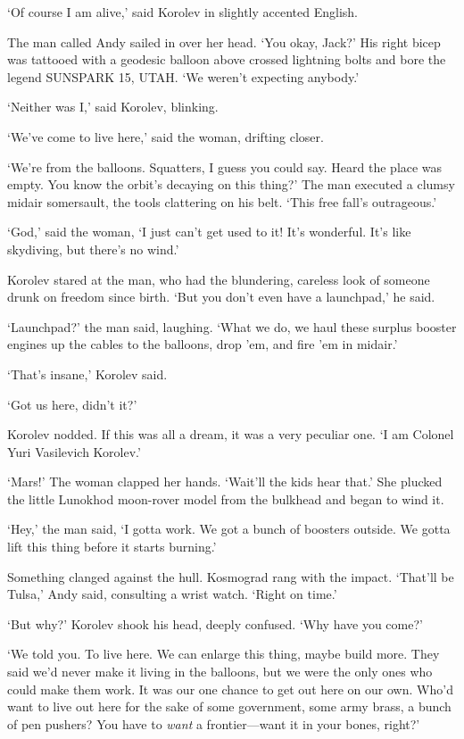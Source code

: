 `Of course I am alive,' said Korolev in slightly accented English.

The man called Andy sailed in over her head. `You okay, Jack?' His right bicep was tattooed with a geodesic balloon above crossed lightning bolts and bore the legend SUNSPARK 15, UTAH. `We weren't expecting anybody.'

`Neither was I,' said Korolev, blinking.

`We've come to live here,' said the woman, drifting closer.

`We're from the balloons. Squatters, I guess you could say. Heard the place was empty. You know the orbit's decaying on this thing?' The man executed a clumsy midair somersault, the tools clattering on his belt. `This free fall's outrageous.'

`God,' said the woman, `I just can't get used to it! It's wonderful. It's like skydiving, but there's no wind.'

Korolev stared at the man, who had the blundering, careless look of someone drunk on freedom since birth. `But you don't even have a launchpad,' he said.

`Launchpad?' the man said, laughing. `What we do, we haul these surplus booster engines up the cables to the balloons, drop 'em, and fire 'em in midair.'

`That's insane,' Korolev said.

`Got us here, didn't it?'

Korolev nodded. If this was all a dream, it was a very peculiar one. `I am Colonel Yuri Vasilevich Korolev.'

`Mars!' The woman clapped her hands. `Wait'll the kids hear that.' She plucked the little Lunokhod moon-rover model from the bulkhead and began to wind it.

`Hey,' the man said, `I gotta work. We got a bunch of boosters outside. We gotta lift this thing before it starts burning.'

Something clanged against the hull. Kosmograd rang with the impact. `That'll be Tulsa,' Andy said, consulting a wrist watch. `Right on time.'

`But why?' Korolev shook his head, deeply confused. `Why have you come?'

`We told you. To live here. We can enlarge this thing, maybe build more. They said we'd never make it living in the balloons, but we were the only ones who could make them work. It was our one chance to get out here on our own. Who'd want to live out here for the sake of some government, some army brass, a bunch of pen pushers? You have to \textit{want} a frontier---want it in your bones, right?'

